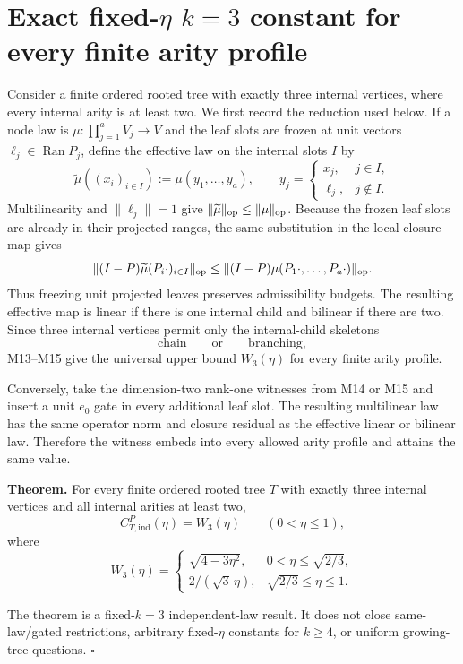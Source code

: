 \section*{Exact fixed-$\eta$ $k=3$ constant for every finite arity profile}
\label{sec:m20-k3-arbitrary-arity}

Consider a finite ordered rooted tree with exactly three internal vertices,
where every internal arity is at least two.  We first record the reduction
used below.  If a node law is
$\mu:\prod_{j=1}^a V_j\to V$ and the leaf slots are frozen at unit vectors
$\ell_j\in\operatorname{Ran}P_j$, define the effective law on the internal
slots $I$ by
\[
 \widetilde\mu((x_i)_{i\in I})
 :=\mu(y_1,\ldots,y_a),\qquad
 y_j=\begin{cases}x_j,&j\in I,\\\ell_j,&j\notin I.
 \end{cases}
\]
Multilinearity and $\|\ell_j\|=1$ give
$\|\widetilde\mu\|_{\rm op}\le\|\mu\|_{\rm op}$.  Because the frozen
leaf slots are already in their projected ranges, the same substitution in
the local closure map gives
\[
 \|(I-P)\widetilde\mu(P_i\cdot)_{i\in I}\|_{\rm op}
 \le \|(I-P)\mu(P_1\cdot,\ldots,P_a\cdot)\|_{\rm op}.
\]
Thus freezing unit projected leaves preserves admissibility budgets.  The
resulting effective map is linear if there is one internal child and bilinear
if there are two.  Since three internal vertices permit only the
internal-child skeletons
\[
  \text{chain}\qquad\text{or}\qquad\text{branching},
\]
M13--M15 give the universal upper bound $W_3(\eta)$ for every finite arity
profile.

Conversely, take the dimension-two rank-one witnesses from M14 or M15 and
insert a unit $e_0$ gate in every additional leaf slot.  The resulting
multilinear law has the same operator norm and closure residual as the
effective linear or bilinear law.  Therefore the witness embeds into every
allowed arity profile and attains the same value.

\textbf{Theorem.}  For every finite ordered rooted tree $T$ with exactly three
internal vertices and all internal arities at least two,
\[
  \boxed{C_{T,\mathrm{ind}}^P(\eta)=W_3(\eta)}
  \qquad (0<\eta\le1),
\]
where
\[
 W_3(\eta)=
 \begin{cases}
 \sqrt{4-3\eta^2},&0<\eta\le\sqrt{2/3},\\[1mm]
 2/(\sqrt3\,\eta),&\sqrt{2/3}\le\eta\le1.
 \end{cases}
\]

The theorem is a fixed-$k=3$ independent-law result.  It does not close
same-law/gated restrictions, arbitrary fixed-$\eta$ constants for $k\ge4$,
or uniform growing-tree questions.
\hfill$\square$
